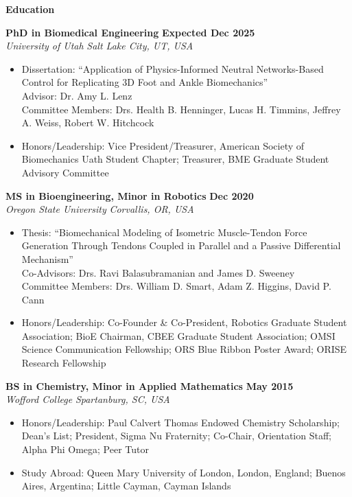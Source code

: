 \documentclass[10pt]{letter}
\begin{document}
\begin{center}
\textbf{\large Education}
\end{center}
\vspace{-5pt}
\textbf{PhD in Biomedical Engineering}
\hfill
\textbf{Expected Dec 2025} \\
\textit{University of Utah}
\hfill
\textit{Salt Lake City, UT, USA} \\
\vspace{2pt}
{\small
\begin{itemize}
    \item Dissertation: ``Application of Physics-Informed Neutral Networks-Based Control for Replicating 3D Foot and Ankle Biomechanics'' \\
    Advisor: Dr. Amy L. Lenz \\
    Committee Members: Drs. Health B. Henninger, Lucas H. Timmins, Jeffrey A. Weiss, Robert W. Hitchcock
    \item Honors/Leadership: Vice President/Treasurer, American Society of Biomechanics Uath Student Chapter; Treasurer, BME Graduate Student Advisory Committee
\end{itemize}}
\vspace{5pt}

\textbf{MS in Bioengineering, Minor in Robotics}
\hfill
\textbf{Dec 2020} \\
\textit{Oregon State University}
\hfill
\textit{Corvallis, OR, USA} \\
\vspace{2pt}
{\small
\begin{itemize}
    \item Thesis: ``Biomechanical Modeling of Isometric Muscle-Tendon Force Generation Through Tendons Coupled in Parallel and a Passive Differential Mechanism'' \\
    Co-Advisors: Drs. Ravi Balasubramanian and James D. Sweeney \\
    Committee Members: Drs. William D. Smart, Adam Z. Higgins, David P. Cann
    \item Honors/Leadership: Co-Founder \& Co-President, Robotics Graduate Student Association; BioE Chairman, CBEE Graduate Student Association; OMSI Science Communication Fellowship; ORS Blue Ribbon Poster Award; ORISE Research Fellowship
\end{itemize}}
\vspace{5pt}

\textbf{BS in Chemistry, Minor in Applied Mathematics}
\hfill
\textbf{May 2015} \\
\textit{Wofford College}
\hfill
\textit{Spartanburg, SC, USA} \\
\vspace{2pt}
{\small
\begin{itemize}
    \item Honors/Leadership: Paul Calvert Thomas Endowed Chemistry Scholarship; Dean's List; President, Sigma Nu Fraternity; Co-Chair, Orientation Staff; Alpha Phi Omega; Peer Tutor
    \item Study Abroad: Queen Mary University of London, London, England; Buenos Aires, Argentina; Little Cayman, Cayman Islands
\end{itemize}}
\vspace{-5pt}
\end{document}
